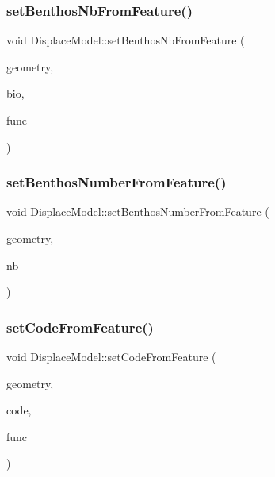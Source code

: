 \mbox{\label{class_displace_model_a4a28b2c05b7732ce15e954e47b93454c}} 
\subsubsection{\texorpdfstring{setBenthosNbFromFeature()}{setBenthosNbFromFeature()}}
{\footnotesize\ttfamily void Displace\+Model\+::set\+Benthos\+Nb\+From\+Feature (\begin{DoxyParamCaption}\item[{O\+G\+R\+Geometry $\ast$}]{geometry,  }\item[{double}]{bio,  }\item[{std\+::function$<$ void(std\+::shared\+\_\+ptr$<$ \mbox{\hyperlink{class_node_data}{Node\+Data}} $>$, double)$>$}]{func }\end{DoxyParamCaption})\hspace{0.3cm}{\ttfamily [protected]}}

\mbox{\label{class_displace_model_adc1346c16dbd6484cd9c7df6f5b102d8}} 
\subsubsection{\texorpdfstring{setBenthosNumberFromFeature()}{setBenthosNumberFromFeature()}}
{\footnotesize\ttfamily void Displace\+Model\+::set\+Benthos\+Number\+From\+Feature (\begin{DoxyParamCaption}\item[{O\+G\+R\+Geometry $\ast$}]{geometry,  }\item[{double}]{nb }\end{DoxyParamCaption})}

\mbox{\label{class_displace_model_af12c5d5a0118188de837bcc1665a06ba}} 
\subsubsection{\texorpdfstring{setCodeFromFeature()}{setCodeFromFeature()}}
{\footnotesize\ttfamily void Displace\+Model\+::set\+Code\+From\+Feature (\begin{DoxyParamCaption}\item[{O\+G\+R\+Geometry $\ast$}]{geometry,  }\item[{int}]{code,  }\item[{std\+::function$<$ void(std\+::shared\+\_\+ptr$<$ \mbox{\hyperlink{class_node_data}{Node\+Data}} $>$, int)$>$}]{func }\end{DoxyParamCaption})\hspace{0.3cm}{\ttfamily [protected]}}


